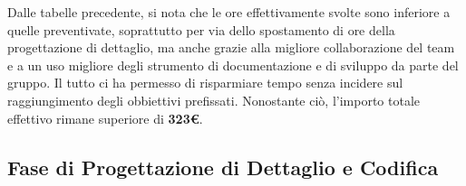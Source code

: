 \documentclass[a4paper,11pt]{article}
\begin{document}
		Dalle tabelle precedente, si nota che le ore effettivamente svolte sono inferiore a quelle preventivate, soprattutto per via dello spostamento di ore della progettazione di dettaglio, ma anche grazie alla migliore collaborazione del team e a un uso migliore degli strumento di documentazione e di sviluppo da parte del gruppo. Il tutto ci ha permesso di risparmiare tempo senza incidere sul raggiungimento degli obbiettivi prefissati. Nonostante ciò, l'importo totale effettivo rimane superiore di \textbf{323\euro}.
	
	
		\subsection{Fase di Progettazione di Dettaglio e Codifica}
		
			
\end{document}
